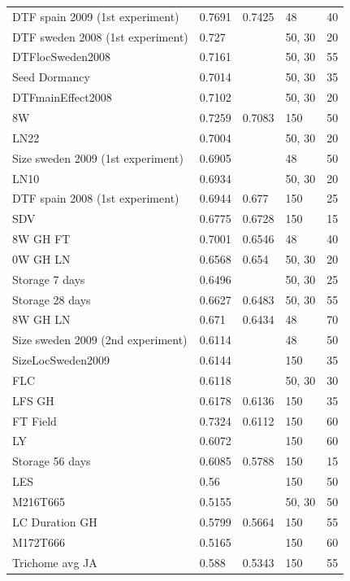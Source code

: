 \begin{longtable}{p{} p{} p{} p{} p{}}
  DTF spain 2009 (1st experiment) & 0.7691 & 0.7425 & 48 & 40 \\
  DTF sweden 2008 (1st experiment) & 0.727 & \color{red}{0.728} & 50, 30 & 20 \\
  DTFlocSweden2008 & 0.7161 & \color{red}{0.7271} & 50, 30 & 55 \\
  Seed Dormancy & 0.7014 & \color{red}{0.7241} & 50, 30 & 35 \\
  DTFmainEffect2008 & 0.7102 & \color{red}{0.7142} & 50, 30 & 20 \\
  8W & 0.7259 & 0.7083 & 150 & 50 \\
  LN22 & 0.7004 & \color{red}{0.7069} & 50, 30 & 20 \\
  Size sweden 2009 (1st experiment) & 0.6905 & \color{red}{0.6994} & 48 & 50 \\
  LN10 & 0.6934 & \color{red}{0.698} & 50, 30 & 20 \\
  DTF spain 2008 (1st experiment) & 0.6944 & 0.677 & 150 & 25 \\
  SDV & 0.6775 & 0.6728 & 150 & 15 \\
  8W GH FT & 0.7001 & 0.6546 & 48 & 40 \\
  0W GH LN & 0.6568 & 0.654 & 50, 30 & 20 \\
  Storage 7 days & 0.6496 & \color{red}{0.65} & 50, 30 & 25 \\
  Storage 28 days & 0.6627 & 0.6483 & 50, 30 & 55 \\
  8W GH LN & 0.671 & 0.6434 & 48 & 70 \\
  Size sweden 2009 (2nd experiment) & 0.6114 & \color{red}{0.6268} & 48 & 50 \\
  SizeLocSweden2009 & 0.6144 & \color{red}{0.619} & 150 & 35 \\
  FLC & 0.6118 & \color{red}{0.6161} & 50, 30 & 30 \\
  LFS GH & 0.6178 & 0.6136 & 150 & 35 \\
  FT Field & 0.7324 & 0.6112 & 150 & 60 \\
  LY  & 0.6072 & \color{red}{0.6088} & 150 & 60 \\
  Storage 56 days & 0.6085 & 0.5788 & 150 & 15 \\
  LES & 0.56 & \color{red}{0.5764} & 150 & 50 \\
  M216T665 & 0.5155 & \color{red}{0.5674} & 50, 30 & 50 \\
  LC Duration GH & 0.5799 & 0.5664 & 150 & 55 \\
  M172T666 & 0.5165 & \color{red}{0.5487} & 150 & 60 \\
  Trichome avg JA & 0.588 & 0.5343 & 150 & 55 \\

\end{longtable}
